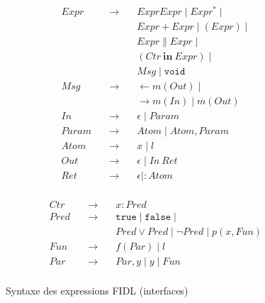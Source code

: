 \begin{figure}[htbp]
\begin{minipage}[t]{.45\textwidth}
    \begin{equation}
\label{eq:syn-fidl}\begin{array}{ccl}
        Expr &\quad\rightarrow\quad& Expr Expr \mid Expr^* \mid \\
        && Expr + Expr \mid (Expr) \mid \\
        && Expr \parallel Expr \mid \\
&&(Ctr\ \mathbf{in}\ Expr) \mid \\
        && Msg \mid \mathtt{void}\\
        Msg &\quad\rightarrow\quad& \leftarrow m(Out) \mid \\
        && \rightarrow m(In) \mid m(Out) \\
        In &\quad\rightarrow\quad& \epsilon \mid Param \\
        Param &\quad\rightarrow\quad& Atom \mid Atom,Param \\
        Atom &\quad\rightarrow\quad& x \mid l \\
        Out &\quad\rightarrow\quad& \epsilon \mid In\ Ret \\
        Ret &\quad\rightarrow\quad& \epsilon \mid : Atom \\
\end{array}
\end{equation}
\end{minipage}
\begin{minipage}[t]{.45\textwidth}
    \begin{equation}
\label{eq:syn-constraint}\begin{array}{ccl}
Ctr &\quad\rightarrow\quad& x : Pred \\
Pred &\quad\rightarrow\quad& \mathtt{true} \mid \mathtt{false} \mid \\
&&Pred \vee Pred \mid \neg{}Pred \mid p
(x,Fun)  \\
Fun &\quad\rightarrow\quad& f(Par) \mid l \\
Par &\quad\rightarrow\quad& Par,y  \mid y \mid Fun \\
\end{array}
\end{equation}
\end{minipage}\centering

\caption{Syntaxe des expressions \textsf{FIDL} (interfaces)}
\label{fig-syn-fidl}
\end{figure}

